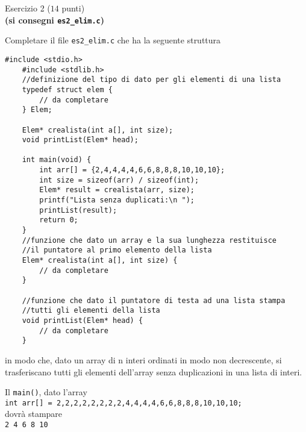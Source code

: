 \documentclass[12pt]{article}
\begin{document}
	
	
	
	
	
	
	
	\newpage
	\vspace*{8ex}
	\begin{center}{\Large Esercizio 2} ($14$ punti)\\
		\textbf{(si consegni \texttt{es2\_elim.c})}
	\end{center}

	Completare il file \texttt{es2\_elim.c} che ha la seguente struttura
	
	\begin{lstlisting}[language=myC]
	#include <stdio.h>
	#include <stdlib.h>
	//definizione del tipo di dato per gli elementi di una lista
	typedef struct elem {
		// da completare 
	} Elem;
	
	Elem* crealista(int a[], int size);
	void printList(Elem* head);
	
	int main(void) {
		int arr[] = {2,4,4,4,4,6,6,8,8,8,10,10,10};
		int size = sizeof(arr) / sizeof(int);
		Elem* result = crealista(arr, size);
		printf("Lista senza duplicati:\n ");
		printList(result);
		return 0;
	}
	//funzione che dato un array e la sua lunghezza restituisce 
	//il puntatore al primo elemento della lista
	Elem* crealista(int a[], int size) {
		// da completare  
	}

	//funzione che dato il puntatore di testa ad una lista stampa 
	//tutti gli elementi della lista
	void printList(Elem* head) {
		// da completare  
	}
	\end{lstlisting}
	in modo che, dato un array di n  interi ordinati in modo non decrescente, si trasferiscano tutti gli elementi dell’array senza duplicazioni in una lista di interi.
	
	\bigskip
	\noindent
	Il \texttt{main()},  dato l'array\\
	\texttt{int arr[] = {2,2,2,2,2,2,2,2,4,4,4,4,6,6,8,8,8,10,10,10};}\\
	dovrà  stampare \\
	\texttt{2 4 6 8 10}
	
	
\end{document}
